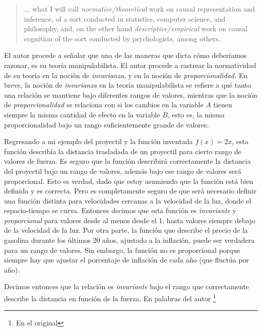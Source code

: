 \begin{quote} 
  $\ldots$ what I will call \emph{normative/theoretical}
  work on causal representation and inference, of a sort
  conducted in statistics, computer science, and philosophy,
  and, on the other hand \emph{descriptive/empirical} work
  on causal cognition of the sort conducted by
  psychologists, among others. \parencite[p.~15]{caushuman}
\end{quote}

El autor procede a señalar que una de las maneras que dicta
cómo deberíamos razonar, es su teoría manipulabilista. El
autor procede a rastrear la normatividad de su teoría en la
noción de \emph{invarianza,} y en la noción de
\emph{proporcionalidad.} En breve, la noción de
\emph{invarianza} en la teoría manipulabilista se refiere a
qué tanto una relación se mantiene bajo diferentes rangos
de valores, mientras que la noción de
\emph{proporcionalidad} se relaciona con si los cambios en
la variable $ A $ tienen siempre la misma cantidad de efecto
en la variable $ B $, esto es,  la misma proporcionalidad
bajo un rango suficientemente grande de valores. 


Regresando a mi ejemplo del proyectil y la función inventada
$ f(x) = 2x $, esta función describía la distancia
trasladada de un proyectil para cierto rango de valores de
fuerza. Es seguro que la función describirá correctamente la
distancia del proyectil bajo un rango de valores, además
bajo ese rango de valores será proporcional. Esto es verdad,
dado que estoy asumiendo que la función está bien definida y
es correcta. Pero es completamente seguro de que será
necesario definir una función distinta para velocidades
cercanas a la velocidad de la luz, donde el espacio-tiempo
se curva. Entonces decimos que esta función es
\emph{invariante} y \emph{proporcional} para valores desde
al menos desde el 1, hasta valores siempre debajo de la
velocidad de la luz. Por otra parte, la función que describe
el precio de la gasolina durante los últimos 20 años,
ajustado a la inflación, puede ser verdadera para un rango
de valores. Sin embargo, la función no es proporcional
porque siempre hay que ajustar el porcentaje de inflación de
cada año (que fluctúa por año).

Decimos entonces  que la relación es \emph{invariante} bajo
el rango que correctamente describe la distancia en función
de la fuerza. En palabras del autor \footnote{
    En el original 
}
\parencite[p.~15]{caushuman} 

